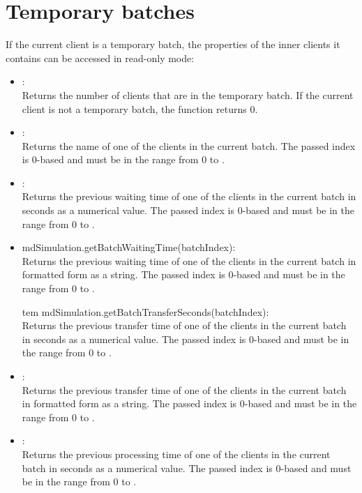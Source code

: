\section{Temporary batches}

If the current client is a temporary batch, the properties of the inner clients
it contains can be accessed in read-only mode:

\begin{itemize}
\item
{}:\\
Returns the number of clients that are in the temporary batch.  
If the current client is not a temporary batch, the function returns 0.

\item
{}:\\
Returns the name of one of the clients in the current batch.
The passed index is 0-based and must be in the range from 0 to .

\item
{}:\\
Returns the previous waiting time of one of the clients in the current batch in seconds as a numerical value.
The passed index is 0-based and must be in the range from 0 to .


\item
md{Simulation.getBatchWaitingTime(batchIndex)}:\\
Returns the previous waiting time of one of the clients in the current batch in formatted form as a string.
The passed index is 0-based and must be in the range from 0 to .


tem
md{Simulation.getBatchTransferSeconds(batchIndex)}:\\
Returns the previous transfer time of one of the clients in the current batch in seconds as a numerical value.
The passed index is 0-based and must be in the range from 0 to .


\item
{}:\\
Returns the previous transfer time of one of the clients in the current batch in formatted form as a string.
The passed index is 0-based and must be in the range from 0 to .

\item
{}:\\
Returns the previous processing time of one of the clients in the current batch in seconds as a numerical value.
The passed index is 0-based and must be in the range from 0 to .


\end{itemize}
